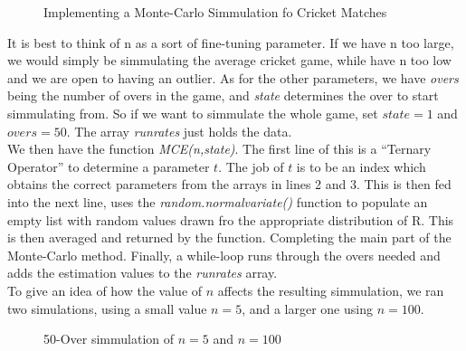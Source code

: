 \begin{figure}[h] %
    \label{mcecode}
    
    \caption{Implementing a Monte-Carlo Simmulation fo Cricket Matches}
\end{figure}

It is best to think of n as a sort of fine-tuning parameter. If we have n too large, we would simply be simmulating the average cricket game, while have n too low and 
we are open to having an outlier. As for the other parameters, we have \textit{overs} being the number of overs in the game, and \textit{state} determines the over to start 
simmulating from. So if we want to simmulate the whole game, set $state=1$ and $overs=50$. The array \textit{runrates} just holds the data.\\

We then have the function \textit{MCE(n,state)}. The first line of this is a ``Ternary Operator'' to determine a parameter $t$. The job of $t$ is to be an index which obtains 
the correct parameters from the arrays in lines 2 and 3. This is then fed into the next line, uses the \textit{random.normalvariate()} function to populate an empty list with random 
values drawn fro the appropriate distribution of R. This is then averaged and returned by the function. Completing the main part of the Monte-Carlo method.
Finally, a while-loop runs through the overs needed and adds the estimation values to the \textit{runrates} array. \\

To give an idea of how the value of $n$ affects the resulting simmulation, we ran two simulations, using a small value $n=5$, and a larger one using $n=100$. 

\begin{figure}[h]
    \centering
    \qquad
    \caption{50-Over simmulation of $n=5$ and $n=100$}
    \label{MeanAndSDRR}
\end{figure}

